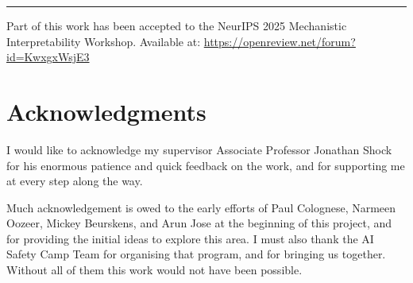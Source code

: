 \documentclass[12pt,a4paper]{report}
\begin{document}
\vspace{1em}
\noindent\rule{\textwidth}{0.5pt}
\small\noindent Part of this work has been accepted to the NeurIPS 2025 Mechanistic Interpretability Workshop. Available at: \url{https://openreview.net/forum?id=KwxgxWsjE3}


\clearpage

\chapter*{Acknowledgments}
I would like to acknowledge my supervisor Associate Professor Jonathan Shock for his enormous patience and quick feedback on the work, and for supporting me at every step along the way.

Much acknowledgement is owed to the early efforts of Paul Colognese, Narmeen Oozeer, Mickey Beurskens, and Arun Jose at the beginning of this project, and for providing the initial ideas to explore this area. I must also thank the AI Safety Camp Team for organising that program, and for bringing us together. Without all of them this work would not have been possible.

\clearpage

\tableofcontents
\clearpage
\listoffigures
\clearpage
\listoftables
\clearpage














\printbibliography

\appendix
\end{document}

